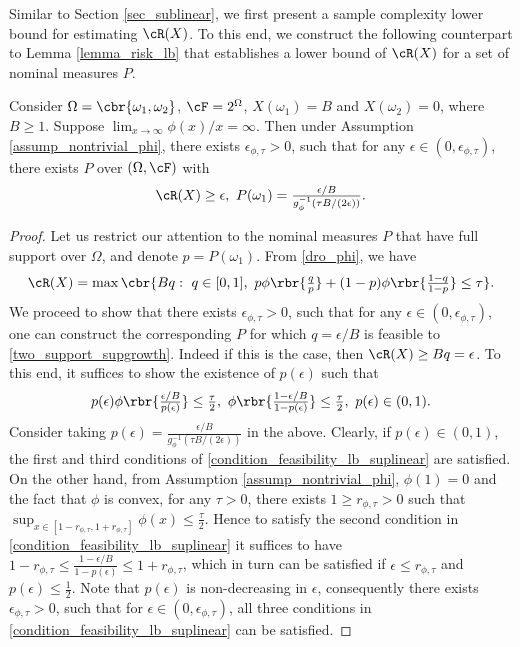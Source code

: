 \documentclass[9pt]{article} %
\numberwithin{equation}{section}
\renewcommand{\frac}[2]{\tfrac{#1}{#2}}
\begin{document}
Similar to Section \ref{sec_sublinear}, we first present a sample complexity lower bound for estimating $\cR(X)$. 
To this end, we construct the following counterpart to Lemma \ref{lemma_risk_lb} that establishes a lower bound of $\cR(X)$ for a set of nominal measures $P$.

\begin{lemma}\label{lemma_risk_lb_suplinear}
Consider $\Omega = \cbr{\omega_1, \omega_2}$, $\cF = 2^\Omega$, $X(\omega_1) = B$ and $X(\omega_2) = 0$, where $B \geq 1$. 
Suppose $\lim_{x \to \infty} {\phi(x)}/{x} = \infty$.
Then under Assumption \ref{assump_nontrivial_phi}, there exists $\epsilon_{\phi, \tau} > 0$, such that for any $\epsilon \in (0, \epsilon_{\phi, \tau})$, 
there exists $P$ over $(\Omega, \cF)$ with 
\begin{align*}
\cR(X) \geq \epsilon, ~ P(\omega_1) = \frac{\epsilon / B}{g_\phi^{-1}( \tau B / (2\epsilon))}.
\end{align*}
\end{lemma}


\begin{proof}
Let us restrict our attention to the nominal measures $P$ that have full support over $\Omega$,
and denote $p = P(\omega_1)$. 
From \eqref{dro_phi}, we have 
\begin{align}\label{two_support_supgrowth}
\cR(X) = \max \cbr{B q  : ~ q \in [0,1], ~  p \phi \rbr{ \frac{q}{p}} + (1-p) \phi \rbr{ \frac{1-q} {1-p} } \leq \tau}.
\end{align}
We proceed to show that there exists $\epsilon_{\phi, \tau} > 0$, such that for any $\epsilon \in (0, \epsilon_{\phi, \tau})$, one can construct the corresponding $P$ for which $q = \epsilon/B$ is feasible to \eqref{two_support_supgrowth}.
Indeed if this is the case, then $\cR(X) \geq Bq = \epsilon$.
To this end, it suffices to show the existence of $p(\epsilon)$ such that 
\begin{align}\label{condition_feasibility_lb_suplinear}
p(\epsilon) \phi \rbr{ \frac{\epsilon / B}{p(\epsilon)} } \leq \frac{\tau}{2}, ~ \phi \rbr{ \frac{1-\epsilon/B}{1-p(\epsilon)}} \leq \frac{\tau}{2}, ~ p(\epsilon) \in (0,1).
\end{align}
Consider taking $p(\epsilon) = \frac{\epsilon / B}{g_\phi^{-1} (\tau B/(2\epsilon))}$ in the above.
Clearly, if $p(\epsilon) \in (0,1)$,  the first and third conditions of \eqref{condition_feasibility_lb_suplinear} are satisfied.  
On the other hand, from Assumption \ref{assump_nontrivial_phi}, $\phi(1) = 0$ and the fact that $\phi$ is convex, for any $\tau > 0$, there exists 
$1 \geq r_{\phi, \tau} > 0$ such that 
$
\sup_{x \in [1-r_{\phi, \tau}, 1+r_{\phi, \tau}] }  \phi(x) \leq \frac{\tau}{2}.
$
Hence to satisfy the second condition in \eqref{condition_feasibility_lb_suplinear} it suffices to have 
$ 1 - r_{\phi, \tau} \leq \frac{1 - \epsilon/ B}{1-p(\epsilon)} \leq 1 + r_{\phi, \tau}$,
which in turn can be satisfied if $\epsilon \leq r_{\phi, \tau}$ and $p(\epsilon) \leq \frac{1}{2}$. 
 Note that $p(\epsilon)$ is non-decreasing in $\epsilon$, consequently there exists $\epsilon_{\phi, \tau} > 0$, such that for $\epsilon \in (0, \epsilon_{\phi, \tau})$, all three conditions in \eqref{condition_feasibility_lb_suplinear} can be satisfied. 
\end{proof}
\end{document}
